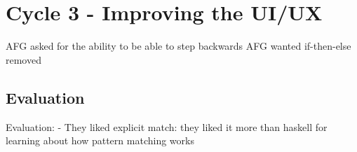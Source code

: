 \chapter{Cycle 3 - Improving the UI/UX}
AFG asked for the ability to be able to step backwards
AFG wanted if-then-else removed


\section{Evaluation}
\label{eval:IFG}
Evaluation:
- They liked explicit match: they liked it more than haskell for learning about how pattern matching works